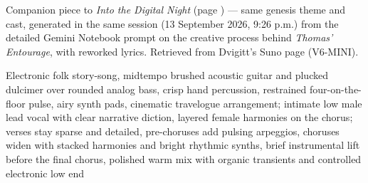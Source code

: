 
\begin{notes}
Companion piece to \emph{Into the Digital Night} (page \pageref{sec:into-the-digital-night}) — same genesis theme and cast, generated in the same session (13 September 2026, 9:26 p.m.) from the detailed Gemini Notebook prompt on the creative process behind \emph{Thomas' Entourage}, with reworked lyrics. Retrieved from Dvigitt's Suno page (V6-MINI).
\end{notes}
\begin{style}
Electronic folk story-song, midtempo brushed acoustic guitar and plucked dulcimer over rounded analog bass, crisp hand percussion, restrained four-on-the-floor pulse, airy synth pads, cinematic travelogue arrangement; intimate low male lead vocal with clear narrative diction, layered female harmonies on the chorus; verses stay sparse and detailed, pre-choruses add pulsing arpeggios, choruses widen with stacked harmonies and bright rhythmic synths, brief instrumental lift before the final chorus, polished warm mix with organic transients and controlled electronic low end
\end{style}
